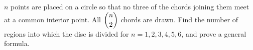 $n$ points are placed on a circle so that no three of the chords joining them meet at a common interior point. All $\dbinom n2$ chords are drawn. Find the number of regions into which the disc is divided for $n=1,2,3,4,5,6$, and prove a general formula.
